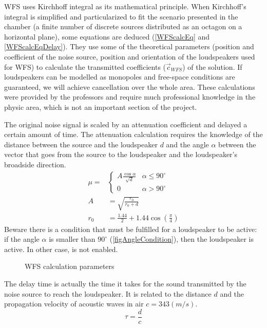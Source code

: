 WFS uses Kirchhoff integral as its mathematical principle. When Kirchhoff's integral is simplified and particularized to fit the scenario presented in the chamber (a finite number of discrete sources distributed as an octagon on a horizontal plane), some equations are deduced (\autoref{WFScalcEq} and \autoref{WFScalcEqDelay}). They use some of the theoretical parameters (position and coefficient of the noise source, position and orientation of the loudspeakers used for WFS) to calculate the transmitted coefficients ($\vec{c}_\mathit{WFS}$) of the solution. If loudspeakers can be modelled as monopoles and free-space conditions are guaranteed, we will achieve cancellation over the whole area. These calculations were provided by the professors and require much professional knowledge in the physic area, which is not an important section of the project.

The original noise signal is scaled by an attenuation coefficient and delayed a certain amount of time. The attenuation calculation requires the knowledge of the distance between the source and the loudspeaker $d$ and the angle $\alpha$ between the vector that goes from the source to the loudspeaker and the loudspeaker's broadside direction.
\begin{equation}
	\begin{aligned}
		\mu = 
		&\begin{cases}
		A\frac{\cos\alpha}{\sqrt{d}} & \alpha \leq 90^\circ \\
		0 & \alpha > 90^\circ
		\end{cases}
		\\
		A &= \sqrt{\frac{r_0}{r_0 + d}}\\
		r_0 &= \frac{1.44}{2} + 1.44 \cos\left( \frac{\pi}{4} \right)
	\end{aligned}
	\label{WFScalcEq}
\end{equation}
Beware there is a condition that must be fulfilled for a loudspeaker to be active: if the angle $\alpha$ is smaller than $90^\circ$ (\autoref{figAngleCondition}), then the loudspeaker is active. In other case, is not enabled.

%	
\begin{figure}
	\centering
	\def\svgwidth{0.4\columnwidth}
	\graphicspath{{Img/}}
	
	\caption[WFS calculation parameters]{WFS calculation parameters}
	\label{figAngleCondition}
\end{figure}

The delay time is actually the time it takes for the sound transmitted by the noise source to reach the loudspeaker. It is related to the distance $d$ and the propagation velocity of acoustic waves in air $c = 343 (m/s)$.
\begin{equation}
	\tau = \frac{d}{c} \label{WFScalcEqDelay}
\end{equation}

